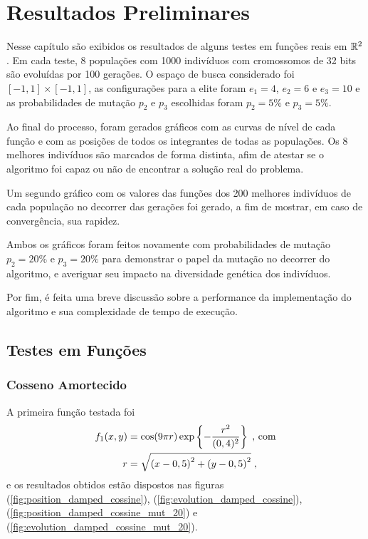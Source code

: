 \chapter{Resultados Preliminares}\label{cap_resultados}

Nesse capítulo são exibidos os resultados de alguns testes em funções reais em $\mathbb{R}^2$. Em cada teste, 
8 populações com 1000 indivíduos com cromossomos de 32 bits são evoluídas por 100 gerações. O espaço de busca
considerado foi $ [-1,1] \times [-1, 1] $, as configurações para a elite foram
$e_1 = 4$, $e_2 = 6$ e $e_3 = 10$ e as probabilidades de mutação $p_2$ e $p_3$ escolhidas
foram $p_2 = 5\%$ e $p_3 = 5\%$.

Ao final do processo,
foram gerados gráficos com as curvas de nível de cada função e com as posições de todos os
integrantes de todas as populações. Os 8 melhores indivíduos são marcados de forma distinta,
afim de atestar se o algoritmo foi capaz ou não de encontrar a solução real do problema.

Um segundo gráfico com os valores das funções dos 200 melhores indivíduos de cada população
no decorrer das gerações foi gerado, a fim de mostrar, em caso de convergência, sua rapidez.

Ambos os gráficos foram feitos novamente com probabilidades de mutação $p_2 = 20\%$ e $p_3 = 20\%$
para demonstrar o papel da mutação no decorrer do algoritmo, e averiguar seu impacto na diversidade genética
dos indivíduos.

Por fim, é feita uma breve discussão sobre a performance da implementação do algoritmo e sua
complexidade de tempo de execução.

\section{Testes em Funções}

\subsection{Cosseno Amortecido}

A primeira função testada foi
\begin{align}
  \begin{split}    
    f_1(x,y) & = \cos(9\pi r)\exp\left\{-\frac{r^2}{(0,4)^2}\right\} \;\text{, com} \\
    r      & = \sqrt{
      \left(x - 0,5\right)^2 +
      \left(y - 0,5\right)^2
    } \;\mathrm{,}
  \end{split}
  \label{eq:func_damped_cossine}
\end{align}
e os resultados obtidos estão dispostos nas figuras (\ref{fig:position_damped_cossine}),
(\ref{fig:evolution_damped_cossine}), (\ref{fig:position_damped_cossine_mut_20}) e 
(\ref{fig:evolution_damped_cossine_mut_20}).

